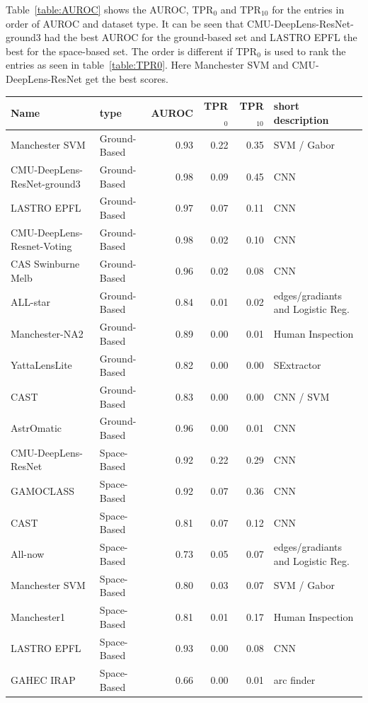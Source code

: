 \documentclass{aa}
\begin{document}
Table~\ref{table:AUROC} shows the AUROC, TPR$_0$ and TPR$_{10}$ for the entries in order of AUROC and dataset type.  It can be seen that CMU-DeepLens-ResNet-ground3 had the best AUROC for the ground-based set and LASTRO EPFL the best for the space-based set.  The order is different if TPR$_0$ is used to rank the entries as seen in table~\ref{table:TPR0}.  Here Manchester SVM and 
CMU-DeepLens-ResNet get the best scores.

\begin{table}
\centering
\begin{tabular}{llrrrl}
  \hline
  Name & type & AUROC & TPR$_0$ & TPR$_{10}$ & short description \\ 
  \hline
 Manchester SVM & Ground-Based & 0.93 & 0.22 & 0.35 & SVM / Gabor \\ 
  CMU-DeepLens-ResNet-ground3 & Ground-Based & 0.98 & 0.09 & 0.45 & CNN \\ 
  LASTRO EPFL & Ground-Based & 0.97 & 0.07 & 0.11 & CNN \\ 
   CMU-DeepLens-Resnet-Voting & Ground-Based & 0.98 & 0.02 & 0.10 & CNN \\ 
   CAS Swinburne Melb & Ground-Based & 0.96 & 0.02 & 0.08 & CNN \\ 
   ALL-star & Ground-Based & 0.84 & 0.01 & 0.02 & edges/gradiants and Logistic Reg. \\ 
   Manchester-NA2 & Ground-Based & 0.89 & 0.00 & 0.01 & Human Inspection \\ 
   YattaLensLite & Ground-Based & 0.82 & 0.00 & 0.00 & SExtractor \\ 
   CAST & Ground-Based & 0.83 & 0.00 & 0.00 & CNN / SVM \\ 
   AstrOmatic & Ground-Based & 0.96 & 0.00 & 0.01 & CNN \\ 
   CMU-DeepLens-ResNet & Space-Based & 0.92 & 0.22 & 0.29 & CNN \\ 
   GAMOCLASS & Space-Based & 0.92 & 0.07 & 0.36 & CNN \\ 
   CAST & Space-Based & 0.81 & 0.07 & 0.12 & CNN \\ 
   All-now & Space-Based & 0.73 & 0.05 & 0.07 & edges/gradiants and Logistic Reg. \\ 
   Manchester SVM & Space-Based & 0.80 & 0.03 & 0.07 & SVM / Gabor \\ 
   Manchester1 & Space-Based & 0.81 & 0.01 & 0.17 & Human Inspection \\ 
   LASTRO EPFL & Space-Based & 0.93 & 0.00 & 0.08 & CNN \\ 
   GAHEC IRAP & Space-Based & 0.66 & 0.00 & 0.01 & arc finder \\ 

\end{tabular}
\end{table}
\end{document}
